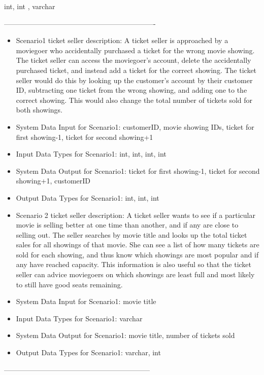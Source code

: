 {\begin{itemize}
\begin{itemize}
\begin{itemize}
	int, int , varchar
	\end{itemize}
 	----------------------------------------------------------------
	\begin{itemize} 
	\item{Scenario1 ticket seller description: }
	A ticket seller is approached by a moviegoer who accidentally purchased a ticket for the wrong movie showing.  The ticket seller can access the moviegoer's account, delete the accidentally purchased ticket, and instead add a ticket for the correct showing.  The ticket seller would do this by looking up the customer's account by their customer ID, subtracting one ticket from the wrong showing, and adding one to the correct showing.  This would also change the total number of tickets sold for both showings.
	\item{System Data Input for Scenario1: }
	customerID, movie showing IDs, ticket for first showing-1, ticket for second showing+1 
	\item{Input Data Types for Scenario1: }
	int, int, int, int
	\item{System Data Output for Scenario1: }
	ticket for first showing-1, ticket for second showing+1, customerID
	\item{Output Data Types for Scenario1: }
	int, int, int
	\end{itemize}
	\begin{itemize} 
	\item{Scenario 2 ticket seller  description: }
	A ticket seller wants to see if a particular movie is selling better at one time than another, and if any are close to selling out.  The seller searches by movie title and looks up the total ticket sales for all showings of that movie.  She can see a list of how many tickets are sold for each showing, and thus know which showings are most popular and if any have reached capacity.  This information is also useful so that the ticket seller can advice moviegoers on which showings are least full and most likely to still have good seats remaining.
	\item{System Data Input for Scenario1: }
	movie title 
	\item{Input Data Types for Scenario1: }
	varchar
	\item{System Data Output for Scenario1: }
	movie title, number of tickets sold
	\item{Output Data Types for Scenario1: }
	varchar, int
	\end{itemize}
 	--------------------------------------------------------------
	\begin{itemize} 

\end{itemize}
\end{itemize}
\end{itemize}}
